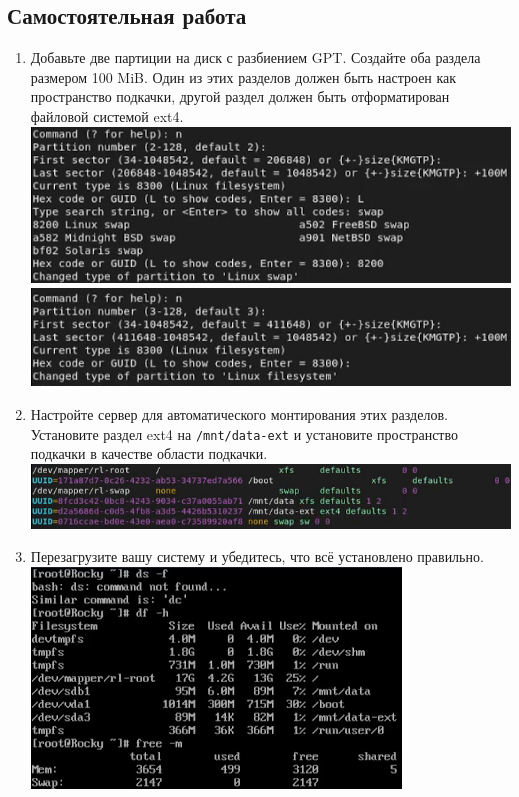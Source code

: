 \documentclass[12pt]{article}
\begin{document}
\subsection{Самостоятельная работа}
\begin{enumerate}
	\item Добавьте две партиции на диск с разбиением GPT.
	      Создайте оба раздела размером 100 MiB.
	      Один из этих разделов должен быть настроен как пространство подкачки, другой раздел должен быть отформатирован файловой системой ext4.
	      \\\includegraphics{13.png}
	      \\\includegraphics{14.png}
	\item Настройте сервер для автоматического монтирования этих разделов.
	      Установите раздел ext4 на \texttt{/mnt/data-ext} и установите пространство подкачки в качестве области подкачки.
	      \\\includegraphics{15.png}
	\item Перезагрузите вашу систему и убедитесь, что всё установлено правильно.
	      \\\includegraphics{16.png}
\end{enumerate}
\end{document}
